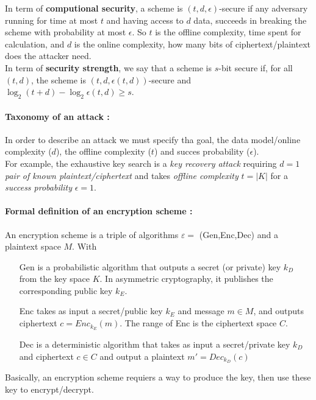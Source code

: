 \documentclass[11pt,a4paper]{report}
\begin{document}
In term of \textbf{computional security}, a scheme is $(t,d,\epsilon)$-secure if any adversary running for time at most $t$ and having access to $d$ data, succeeds in breaking the scheme with probability at most $\epsilon$. So $t$ is the offline complexity, time spent for calculation, and $d$ is the online complexity, how many bits of ciphertext/plaintext does the attacker need.\\
In term of \textbf{security strength}, we say that a scheme is $s$-bit secure if, for all $(t, d)$, the scheme is $(t, d, \epsilon(t, d))$-secure and $\log_2 (t + d) - \log_2 \epsilon(t, d) \geq s$.\\

\paragraph{Taxonomy of an attack :} In order to describe an attack we must specify tha goal, the data model/online complexity ($d$), the offline complexity ($t$) and succes probability ($\epsilon$).\\
For example, the exhaustive key search is a \emph{key recovery attack} requiring $d=1$ \emph{pair of known plaintext/ciphertext} and takes \emph{offline complexity} $t=|K|$ for a \emph{success probability} $\epsilon = 1$.

\paragraph{Formal definition of an encryption scheme :}
An encryption scheme is a triple of algorithms $\varepsilon =$ (Gen,Enc,Dec) and a plaintext space $M$. With
\begin{itemize}
\item[Gen] is a probabilistic algorithm that outputs a secret (or private) key $k_D$ from the key space $K$. In asymmetric cryptography, it publishes the corresponding public key $k_E$.
\item[Enc] takes as input a secret/public key $k_E$ and message $m \in M$, and outputs ciphertext $c = Enc_{k_E} (m)$. The range of Enc is the ciphertext space $C$.
\item[Dec] is a deterministic algorithm that takes as input a secret/private key $k_D$ and ciphertext $c \in C$ and output a plaintext $m' = Dec_{k_D} (c)$
\end{itemize}
Basically, an encryption scheme requiers a way to produce the key, then use these key to encrypt/decrypt.\\
\\
\end{document}

